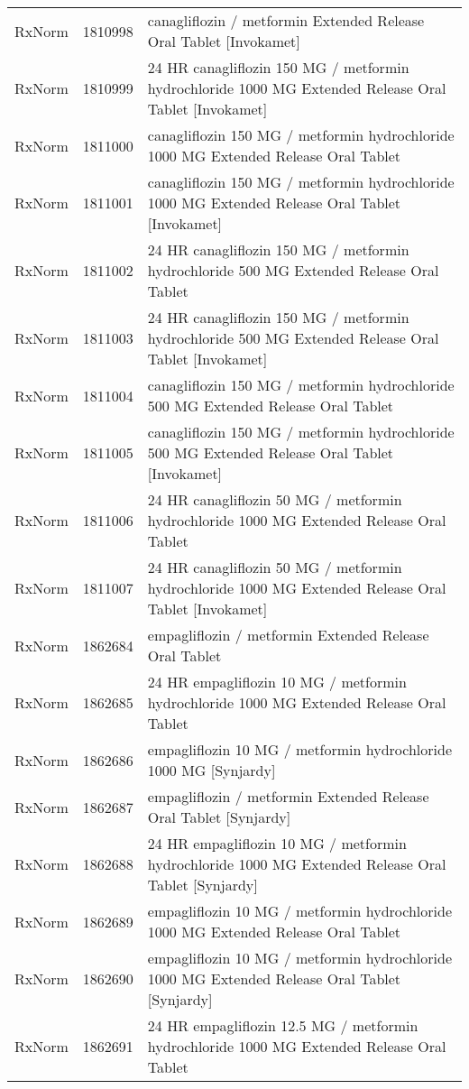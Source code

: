 \begin{longtable}{p{}p{}p{}}
  RxNorm & 1810998 & canagliflozin / metformin Extended Release Oral Tablet [Invokamet] \\ 
  RxNorm & 1810999 & 24 HR canagliflozin 150 MG / metformin hydrochloride 1000 MG Extended Release Oral Tablet [Invokamet] \\ 
  RxNorm & 1811000 & canagliflozin 150 MG / metformin hydrochloride 1000 MG Extended Release Oral Tablet \\ 
  RxNorm & 1811001 & canagliflozin 150 MG / metformin hydrochloride 1000 MG Extended Release Oral Tablet [Invokamet] \\ 
  RxNorm & 1811002 & 24 HR canagliflozin 150 MG / metformin hydrochloride 500 MG Extended Release Oral Tablet \\ 
  RxNorm & 1811003 & 24 HR canagliflozin 150 MG / metformin hydrochloride 500 MG Extended Release Oral Tablet [Invokamet] \\ 
  RxNorm & 1811004 & canagliflozin 150 MG / metformin hydrochloride 500 MG Extended Release Oral Tablet \\ 
  RxNorm & 1811005 & canagliflozin 150 MG / metformin hydrochloride 500 MG Extended Release Oral Tablet [Invokamet] \\ 
  RxNorm & 1811006 & 24 HR canagliflozin 50 MG / metformin hydrochloride 1000 MG Extended Release Oral Tablet \\ 
  RxNorm & 1811007 & 24 HR canagliflozin 50 MG / metformin hydrochloride 1000 MG Extended Release Oral Tablet [Invokamet] \\ 
  RxNorm & 1862684 & empagliflozin / metformin Extended Release Oral Tablet \\ 
  RxNorm & 1862685 & 24 HR empagliflozin 10 MG / metformin hydrochloride 1000 MG Extended Release Oral Tablet \\ 
  RxNorm & 1862686 & empagliflozin 10 MG / metformin hydrochloride 1000 MG [Synjardy] \\ 
  RxNorm & 1862687 & empagliflozin / metformin Extended Release Oral Tablet [Synjardy] \\ 
  RxNorm & 1862688 & 24 HR empagliflozin 10 MG / metformin hydrochloride 1000 MG Extended Release Oral Tablet [Synjardy] \\ 
  RxNorm & 1862689 & empagliflozin 10 MG / metformin hydrochloride 1000 MG Extended Release Oral Tablet \\ 
  RxNorm & 1862690 & empagliflozin 10 MG / metformin hydrochloride 1000 MG Extended Release Oral Tablet [Synjardy] \\ 
  RxNorm & 1862691 & 24 HR empagliflozin 12.5 MG / metformin hydrochloride 1000 MG Extended Release Oral Tablet \\ 

\end{longtable}
